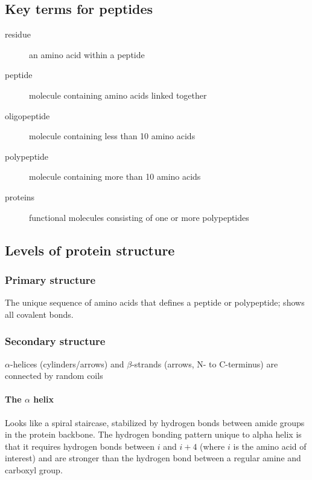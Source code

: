\documentclass[letterpaper, 12pt]{article}
\begin{document}
\subsection*{Key terms for peptides}

\begin{description}
\item [residue] an amino acid within a peptide
\item [peptide] molecule containing amino acids linked together
\item [oligopeptide] molecule containing less than 10 amino acids
\item [polypeptide] molecule containing more than 10 amino acids
\item [proteins] functional molecules consisting of one or more polypeptides
\end{description}

\subsection*{Levels of protein structure}

\subsubsection*{Primary structure}
The unique sequence of amino acids that defines a peptide or polypeptide; shows all covalent bonds.

\subsubsection*{Secondary structure}
$\alpha$-helices (cylinders/arrows) and $\beta$-strands (arrows, N- to C-terminus) are connected by random coils

\paragraph{The $\alpha$ helix} Looks like a spiral staircase, stabilized by hydrogen bonds between amide groups in the protein backbone. The hydrogen bonding pattern unique to alpha helix is that it requires hydrogen bonds between $i$ and $i+4$ (where $i$ is the amino acid of interest) and are stronger than the hydrogen bond between a regular amine and carboxyl group.
\end{document}

